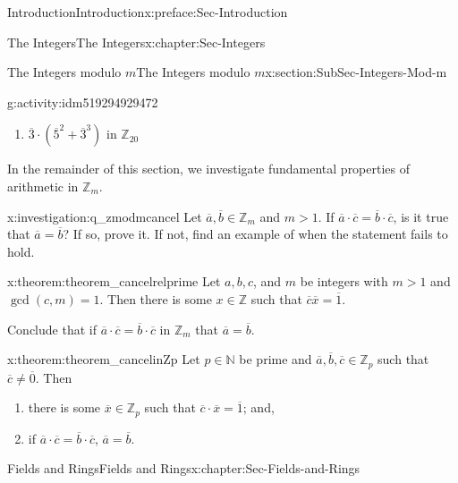 \documentclass[oneside,10pt,]{book}
\numberwithin{equation}{section}
\def\Z{{\mathbb Z}}
\def\N{{\mathbb N}}
\begin{document}
\begin{preface}{Introduction}{}{Introduction}{}{}{x:preface:Sec-Introduction}
\begin{chapterptx}{The Integers}{}{The Integers}{}{}{x:chapter:Sec-Integers}
\begin{sectionptx}{The Integers modulo \(m\)}{}{The Integers modulo \(m\)}{}{}{x:section:SubSec-Integers-Mod-m}
\begin{activity}{}{g:activity:idm519294929472}
\begin{enumerate}
\item{}\(\overline{3}\cdot(\overline{5}^2+\overline{3}^3)\) in \(\Z_{20}\)%
\end{enumerate}
\end{activity}
In the remainder of this section, we investigate fundamental properties of arithmetic in \(\Z_m\).%
\begin{investigation}{}{x:investigation:q_zmodmcancel}%
Let \(\overline{a},\overline{b}\in \Z_m\) and \(m > 1\). If \(\overline{a}\cdot \overline{c} = \overline{b}\cdot \overline{c}\), is it true that \(\overline{a} = \overline{b}\)? If so, prove it. If not, find an example of when the statement fails to hold.%
\end{investigation}
\begin{theorem}{}{}{x:theorem:theorem_cancelrelprime}%
Let \(a,b,c\), and \(m\) be integers with \(m > 1\) and \(\gcd(c,m)=1\). Then there is some \(x\in \Z\) such that \(\overline{c} \overline{x} = \overline{1}\).%
\par
Conclude that if \(\overline{a} \cdot\overline{c} = \overline{b}\cdot\overline{c}\) in \(\Z_m\) that \(\overline{a} = \overline{b}\).%
\end{theorem}
\begin{theorem}{}{}{x:theorem:theorem_cancelinZp}%
Let \(p\in \N\) be prime and \(\overline{a},\overline{b},\overline{c}\in \Z_p\) such that \(\overline{c}\ne \overline{0}\). Then%
\begin{enumerate}
\item{}there is some \(\overline{x}\in \Z_p\) such that \(\overline{c}\cdot \overline{x} = \overline{1}\); and,%
\item{}if \(\overline{a} \cdot\overline{c} = \overline{b}\cdot\overline{c}\), \(\overline{a} = \overline{b}\).%
\end{enumerate}
%
\end{theorem}
\end{sectionptx}
\end{chapterptx}
%
%
\typeout{************************************************}
\typeout{************************************************}
%
\begin{chapterptx}{Fields and Rings}{}{Fields and Rings}{}{}{x:chapter:Sec-Fields-and-Rings}
\begin{introduction}{}%

\end{introduction}
\end{chapterptx}
\end{preface}
\end{document}
